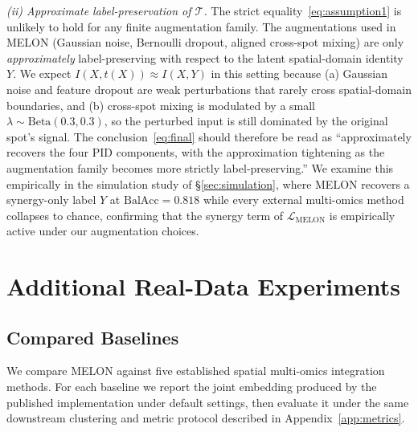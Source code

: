 \documentclass{article}
\theoremstyle{plain}
\theoremstyle{definition}
\begin{document}
\emph{(ii) Approximate label-preservation of $\mathcal{T}$.} The strict equality~\eqref{eq:assumption1} is unlikely to hold for any finite augmentation family. The augmentations used in MELON (Gaussian noise, Bernoulli dropout, aligned cross-spot mixing) are only \emph{approximately} label-preserving with respect to the latent spatial-domain identity $Y$. We expect $I(X, t(X)) \approx I(X, Y)$ in this setting because (a) Gaussian noise and feature dropout are weak perturbations that rarely cross spatial-domain boundaries, and (b) cross-spot mixing is modulated by a small $\lambda \sim \mathrm{Beta}(0.3, 0.3)$, so the perturbed input is still dominated by the original spot's signal. The conclusion~\eqref{eq:final} should therefore be read as ``approximately recovers the four PID components, with the approximation tightening as the augmentation family becomes more strictly label-preserving.'' We examine this empirically in the simulation study of \S\ref{sec:simulation}, where MELON recovers a synergy-only label $Y$ at $\mathrm{BalAcc} = 0.818$ while every external multi-omics method collapses to chance, confirming that the synergy term of $\mathcal{L}_{\mathrm{MELON}}$ is empirically active under our augmentation choices.

\section{Additional Real-Data Experiments}\label{app:extra-exp}

\subsection{Compared Baselines}\label{app:baselines}

We compare MELON against five established spatial multi-omics integration methods. For each baseline we report the joint embedding produced by the published implementation under default settings, then evaluate it under the same downstream clustering and metric protocol described in Appendix~\ref{app:metrics}.
\end{document}
